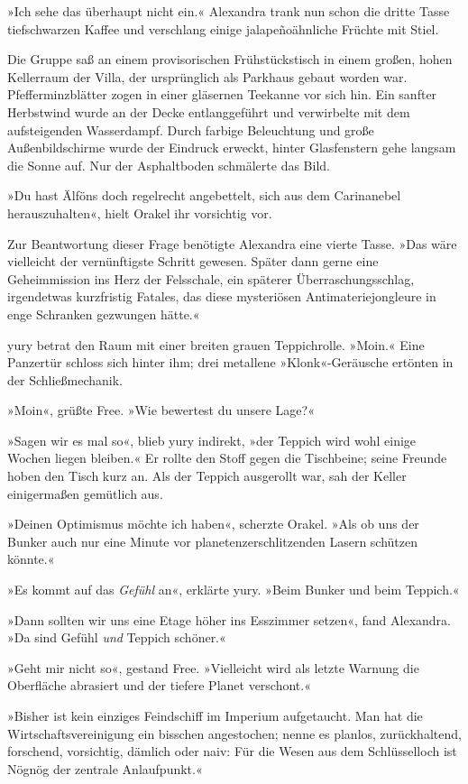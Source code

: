 »Ich sehe das überhaupt nicht ein.« Alexandra trank nun schon die dritte Tasse tiefschwarzen Kaffee und verschlang einige jalapeñoähnliche Früchte mit Stiel.

Die Gruppe saß an einem provisorischen Frühstückstisch in einem großen, hohen Kellerraum der Villa, der ursprünglich als Parkhaus gebaut worden war. Pfefferminzblätter zogen in einer gläsernen Teekanne vor sich hin. Ein sanfter Herbstwind wurde an der Decke entlanggeführt und verwirbelte mit dem aufsteigenden Wasserdampf. Durch farbige Beleuchtung und große Außenbildschirme wurde der Eindruck erweckt, hinter Glasfenstern gehe langsam die Sonne auf. Nur der Asphaltboden schmälerte das Bild.

»Du hast Älföns doch regelrecht angebettelt, sich aus dem Carinanebel herauszuhalten«, hielt Orakel ihr vorsichtig vor.

Zur Beantwortung dieser Frage benötigte Alexandra eine vierte Tasse. »Das wäre vielleicht der vernünftigste Schritt gewesen. Später dann gerne eine Geheimmission ins Herz der Felsschale, ein späterer Überraschungsschlag, irgendetwas kurzfristig Fatales, das diese mysteriösen Antimateriejongleure in enge Schranken gezwungen hätte.«

yury betrat den Raum mit einer breiten grauen Teppichrolle. »Moin.« Eine Panzertür schloss sich hinter ihm; drei metallene »Klonk«-Geräusche ertönten in der Schließmechanik.

»Moin«, grüßte Free. »Wie bewertest du unsere Lage?«

»Sagen wir es mal so«, blieb yury indirekt, »der Teppich wird wohl einige Wochen liegen bleiben.« Er rollte den Stoff gegen die Tischbeine; seine Freunde hoben den Tisch kurz an. Als der Teppich ausgerollt war, sah der Keller einigermaßen gemütlich aus.

»Deinen Optimismus möchte ich haben«, scherzte Orakel. »Als ob uns der Bunker auch nur eine Minute vor planetenzerschlitzenden Lasern schützen könnte.«

»Es kommt auf das \emph{Gefühl} an«, erklärte yury. »Beim Bunker und beim Teppich.«

»Dann sollten wir uns eine Etage höher ins Esszimmer setzen«, fand Alexandra. »Da sind Gefühl \emph{und} Teppich schöner.«

»Geht mir nicht so«, gestand Free. »Vielleicht wird als letzte Warnung die Oberfläche abrasiert und der tiefere Planet verschont.«

»Bisher ist kein einziges Feindschiff im Imperium aufgetaucht. Man hat die Wirtschaftsvereinigung ein bisschen angestochen; nenne es planlos, zurückhaltend, forschend, vorsichtig, dämlich oder naiv: Für die Wesen aus dem Schlüsselloch ist Nögnög der zentrale Anlaufpunkt.«

